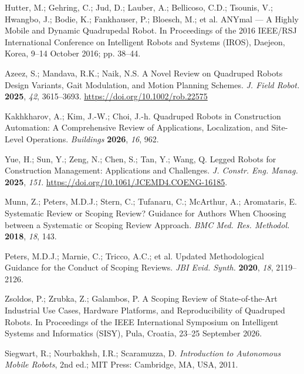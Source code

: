 Hutter, M.; Gehring, C.; Jud, D.; Lauber, A.; Bellicoso, C.D.; Tsounis,
V.; Hwangbo, J.; Bodie, K.; Fankhauser, P.; Bloesch, M.; et al. ANYmal ---
A Highly Mobile and Dynamic Quadrupedal Robot. In Proceedings of the 2016
IEEE/RSJ International Conference on Intelligent Robots and Systems
(IROS), Daejeon, Korea, 9--14 October 2016; pp. 38--44.

Azeez, S.; Mandava, R.K.; Naik, N.S. A Novel Review on Quadruped Robots
Design Variants, Gait Modulation, and Motion Planning Schemes. {\em J.
Field Robot.} {\bf 2025}, {\em 42}, 3615--3693.
\url{https://doi.org/10.1002/rob.22575}

Kakhkharov, A.; Kim, J.-W.; Choi, J.-h. Quadruped Robots in Construction
Automation: A Comprehensive Review of Applications, Localization, and
Site-Level Operations. {\em Buildings} {\bf 2026}, {\em 16}, 962.

Yue, H.; Sun, Y.; Zeng, N.; Chen, S.; Tan, Y.; Wang, Q. Legged Robots for
Construction Management: Applications and Challenges. {\em J. Constr.
Eng. Manag.} {\bf 2025}, {\em 151}.
\url{https://doi.org/10.1061/JCEMD4.COENG-16185}.

Munn, Z.; Peters, M.D.J.; Stern, C.; Tufanaru, C.; McArthur, A.;
Aromataris, E. Systematic Review or Scoping Review? Guidance for Authors
When Choosing between a Systematic or Scoping Review Approach. {\em BMC
Med. Res. Methodol.} {\bf 2018}, {\em 18}, 143.

Peters, M.D.J.; Marnie, C.; Tricco, A.C.; et al. Updated Methodological
Guidance for the Conduct of Scoping Reviews. {\em JBI Evid. Synth.}
{\bf 2020}, {\em 18}, 2119--2126.

Zsoldos, P.; Zrubka, Z.; Galambos, P. A Scoping Review of
State-of-the-Art Industrial Use Cases, Hardware Platforms, and
Reproducibility of Quadruped Robots. In Proceedings of the IEEE
International Symposium on Intelligent Systems and Informatics (SISY),
Pula, Croatia, 23--25 September 2026.

Siegwart, R.; Nourbakhsh, I.R.; Scaramuzza, D. {\em Introduction to
Autonomous Mobile Robots}, 2nd ed.; MIT Press: Cambridge, MA, USA, 2011.

